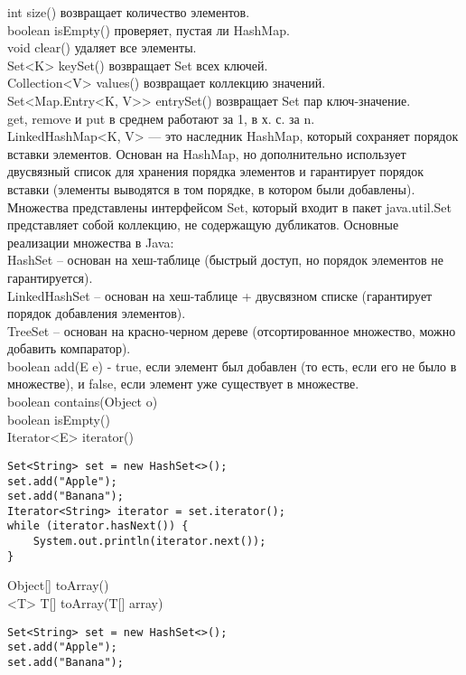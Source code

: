 {int size() возвращает количество элементов. \\
boolean isEmpty() проверяет, пустая ли HashMap. \\
void clear() удаляет все элементы. \\
Set<K> keySet()	возвращает Set всех ключей. \\
Collection<V> values() возвращает коллекцию значений. \\
Set<Map.Entry<K, V>> entrySet() возвращает Set пар ключ-значение. \\
get, remove и put в среднем работают за 1, в х. с. за n. \\
LinkedHashMap<K, V> — это наследник HashMap, который сохраняет порядок вставки элементов. Основан на HashMap, но дополнительно использует двусвязный список для хранения порядка элементов и гарантирует порядок вставки (элементы выводятся в том порядке, в котором были добавлены). \\
Множества представлены интерфейсом Set, который входит в пакет java.util.Set представляет собой коллекцию, не содержащую дубликатов. Основные реализации множества в Java: \\
HashSet – основан на хеш-таблице (быстрый доступ, но порядок элементов не гарантируется). \\
LinkedHashSet – основан на хеш-таблице + двусвязном списке (гарантирует порядок добавления элементов). \\
TreeSet – основан на красно-черном дереве (отсортированное множество, можно добавить компаратор). \\
boolean add(E e) - true, если элемент был добавлен (то есть, если его не было в множестве), и false, если элемент уже существует в множестве. \\
boolean contains(Object o) \\
boolean isEmpty() \\
Iterator<E> iterator() \\
\begin{lstlisting}
Set<String> set = new HashSet<>();
set.add("Apple");
set.add("Banana");
Iterator<String> iterator = set.iterator();
while (iterator.hasNext()) {
    System.out.println(iterator.next());
}
\end{lstlisting}
Object[] toArray() \\
<T> T[] toArray(T[] array) \\
\begin{lstlisting}
Set<String> set = new HashSet<>();
set.add("Apple");
set.add("Banana");


\end{lstlisting}}
